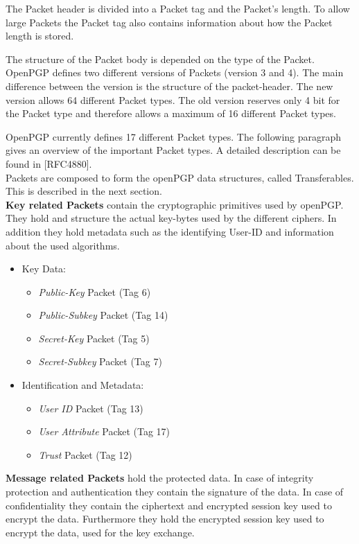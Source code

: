 The Packet header is divided into a Packet tag and the Packet's length. To allow large Packets the Packet tag also contains information about how the Packet length is stored. 

The structure of the Packet body is depended on the type of the Packet. \\


OpenPGP defines two different versions of Packets (version 3 and 4). The main difference between the version is the structure of the packet-header. The new version allows 64 different Packet types. The old version reserves only 4 bit for the Packet type and therefore allows a maximum of 16 different Packet types.

OpenPGP currently defines 17 different Packet types. The following paragraph gives an overview of the important Packet types. A detailed description can be found in [RFC4880]. \\ 

Packets are composed to form the openPGP data structures, called Transferables. This is described in the next section. \\

\textbf{Key related Packets} contain the cryptographic primitives used by openPGP. They hold and structure the actual key-bytes used by the different ciphers. In addition they hold metadata such as the identifying User-ID and information about the used algorithms.

\begin{itemize}
	\item Key Data:
	\begin{itemize}
		\item \textit{Public-Key} Packet (Tag 6)
		\item \textit{Public-Subkey} Packet (Tag 14)
		\item \textit{Secret-Key} Packet (Tag 5)
		\item \textit{Secret-Subkey} Packet (Tag 7)
	\end{itemize}
	\item Identification and Metadata:
	\begin{itemize}
		\item \textit{User ID} Packet (Tag 13)
		\item \textit{User Attribute} Packet (Tag 17)
		\item \textit{Trust} Packet (Tag 12)
	\end{itemize}
\end{itemize}

\textbf{Message related Packets} hold the protected data. In case of integrity protection and authentication they contain the signature of the data. In case of confidentiality they contain the ciphertext and encrypted session key used to encrypt the data.
Furthermore they hold the encrypted session key used to encrypt the data, used for the key exchange.

